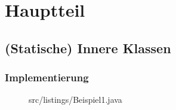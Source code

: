 \chapter{Hauptteil}
\section{(Statische) Innere Klassen}
\subsection {Implementierung}


\begin{figure}[hbt]
\lstset{language=Java}
 {src/listings/Beispiel1.java}
\end{figure}
